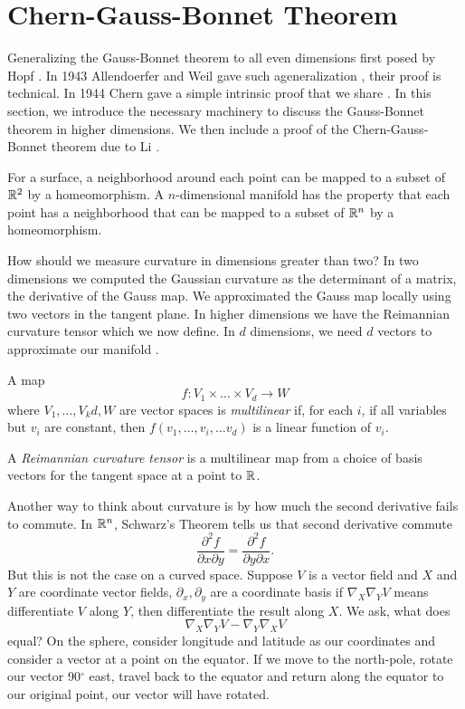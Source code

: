 \section{Chern-Gauss-Bonnet Theorem}
\label{sec:chern-gauss-bonnet}

Generalizing the Gauss-Bonnet theorem to all even dimensions
first posed by Hopf \cite{?}.
In 1943 Allendoerfer and Weil gave such ageneralization \cite{},
their proof is technical. In 1944 Chern gave a simple intrinsic proof
that we share \cite{chern_simple_1944}. In this section, we introduce
the necessary machinery to discuss the Gauss-Bonnet theorem in higher
dimensions. We then include a proof of the Chern-Gauss-Bonnet theorem
due to Li \cite{li_gauss-bonnet-chern_2011}. 

For a surface, a neighborhood around each point can be mapped 
 to a subset of $\mathbb{R}^2$ by a  homeomorphism. A $n$-dimensional manifold has
the property that each point has a neighborhood that can be mapped
to a subset of $\mathbb{R}^n$ by a homeomorphism.


How should we measure curvature in dimensions greater than two?
In two dimensions we computed the Gaussian curvature as the determinant of
a matrix, the derivative of the Gauss map. We approximated the Gauss map
locally using two vectors in the tangent plane.
In higher dimensions we have the Reimannian curvature tensor which we now define.
In $d$ dimensions, we need $d$ vectors to approximate our manifold .



A map 
$$f:V_1\times \ldots \times V_d\rightarrow W$$ where $V_1,\ldots, V_kd,W$ are vector spaces
is \emph{multilinear} if, for each $i$, if all variables but $v_i$ are constant, then $f(v_1,\ldots ,v_i,\ldots
v_d)$ is a linear function of $v_i.$

A \emph{Reimannian curvature tensor } is a multilinear map from a choice of basis vectors for the tangent
space at a point to $\mathbb{R}$. 


Another way to think about curvature is by how much the second derivative fails
to commute. In $\mathbb{R}^n$, Schwarz's Theorem tells us that second derivative commute
$$\frac{\partial^2 f}{\partial x\partial y}=\frac{\partial^2 f}{\partial y\partial x}.$$
But this is not the case on a curved space. Suppose $V$ is a vector field and $X$ and $Y$
are coordinate vector fields, $\partial_x,\partial_y$ are
a coordinate basis if $\nabla_X \nabla_Y V$ means differentiate $V$ along $Y$, then differentiate
the result along $X.$
We ask, what does 
$$\nabla_X\nabla_YV-\nabla_Y\nabla_X V$$
equal?
On the sphere, consider longitude and latitude as our coordinates and consider
a vector at a point on the equator. If we move to the north-pole, rotate our vector 90$^\circ$ east,
travel back to the equator and return along the equator to our original point, our vector will have rotated.

